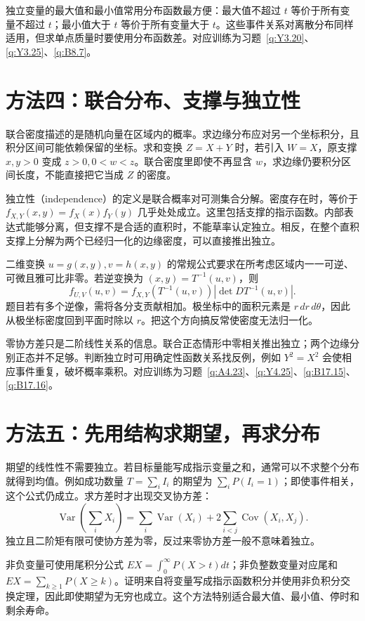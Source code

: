 \documentclass[UTF8,12pt,a4paper,fontset=fandol]{ctexart}
\begin{document}
独立变量的最大值和最小值常用分布函数最方便：最大值不超过 $t$ 等价于所有变量不超过 $t$；最小值大于 $t$ 等价于所有变量大于 $t$。这些事件关系对离散分布同样适用，但求单点质量时要使用分布函数差。对应训练为习题~\ref{q:Y3.20}、\ref{q:Y3.25}、\ref{q:B8.7}。

\section*{方法四：联合分布、支撑与独立性}
联合密度描述的是随机向量在区域内的概率。求边缘分布应对另一个坐标积分，且积分区间可能依赖保留的坐标。求和变换 $Z=X+Y$ 时，若引入 $W=X$，原支撑 $x,y>0$ 变成 $z>0,0<w<z$。联合密度里即使不再显含 $w$，求边缘仍要积分区间长度，不能直接把它当成 $Z$ 的密度。

独立性（independence）的定义是联合概率对可测集合分解。密度存在时，等价于 $f_{X,Y}(x,y)=f_X(x)f_Y(y)$ 几乎处处成立。这里包括支撑的指示函数。内部表达式能够分离，但支撑不是合适的直积时，不能草率认定独立。相反，在整个直积支撑上分解为两个已经归一化的边缘密度，可以直接推出独立。

二维变换 $u=g(x,y),v=h(x,y)$ 的常规公式要求在所考虑区域内一一可逆、可微且雅可比非零。若逆变换为 $(x,y)=T^{-1}(u,v)$，则
\[
f_{U,V}(u,v)=f_{X,Y}(T^{-1}(u,v))\left|\det D T^{-1}(u,v)\right|.
\]
题目若有多个逆像，需将各分支贡献相加。极坐标中的面积元素是 $r\,dr\,d\theta$，因此从极坐标密度回到平面时除以 $r$。把这个方向搞反常使密度无法归一化。

零协方差只是二阶线性关系的信息。联合正态情形中零相关推出独立；两个边缘分别正态并不足够。判断独立时可用确定性函数关系找反例，例如 $Y^2=X^2$ 会使相应事件重复，破坏概率乘积。对应训练为习题~\ref{q:A4.23}、\ref{q:Y4.25}、\ref{q:B17.15}、\ref{q:B17.16}。

\section*{方法五：先用结构求期望，再求分布}
期望的线性性不需要独立。若目标量能写成指示变量之和，通常可以不求整个分布就得到均值。例如成功数量 $T=\sum_iI_i$ 的期望为 $\sum_iP(I_i=1)$；即使事件相关，这个公式仍成立。求方差时才出现交叉协方差：
\[
\operatorname{Var}\left(\sum_iX_i\right)=\sum_i\operatorname{Var}(X_i)+2\sum_{i<j}\operatorname{Cov}(X_i,X_j).
\]
独立且二阶矩有限可使协方差为零，反过来零协方差一般不意味着独立。

非负变量可使用尾积分公式 $EX=\int_0^\infty P(X>t)dt$；非负整数变量对应尾和 $EX=\sum_{k\ge1}P(X\ge k)$。证明来自将变量写成指示函数积分并使用非负积分交换定理，因此即使期望为无穷也成立。这个方法特别适合最大值、最小值、停时和剩余寿命。
\end{document}
